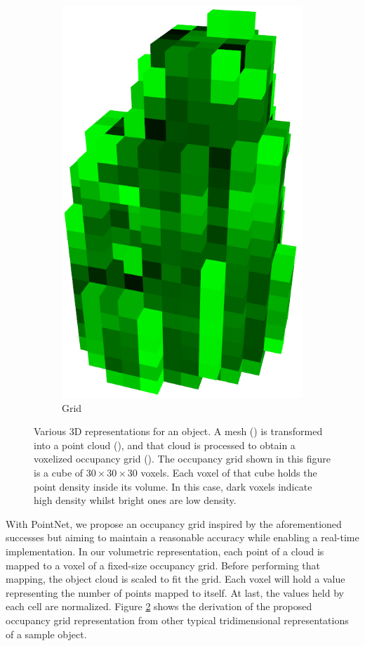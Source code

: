 \begin{figure}[!t]
\begin{subfigure}{0.3\linewidth}
    \includegraphics[width=0.8\linewidth]{Figures/ObjRecog/detergent_grid.png}
    \caption{Grid}
    \label{fig:objrecog:meshcloudgrid:grid}
  \end{subfigure}
  \caption{Various 3D representations for an object. A mesh () is transformed into a point cloud (), and that cloud is processed to obtain a voxelized occupancy grid (). The occupancy grid shown in this figure is a cube of $30\times 30 \times 30$ voxels. Each voxel of that cube holds the point density inside its volume. In this case, dark voxels indicate high density whilst bright ones are low density.}
  \label{fig:objrecog:meshcloudgrid}
\end{figure}

With PointNet, we propose an occupancy grid inspired by the aforementioned successes but aiming to maintain a reasonable accuracy while enabling a real-time implementation. In our volumetric representation, each point of a cloud is mapped to a voxel of a fixed-size occupancy grid. Before performing that mapping, the object cloud is scaled to fit the grid. Each voxel will hold a value representing the number of points mapped to itself. At last, the values held by each cell are normalized. Figure \ref{fig:objrecog:meshcloudgrid} shows the derivation of the proposed occupancy grid representation from other typical tridimensional representations of a sample object.

